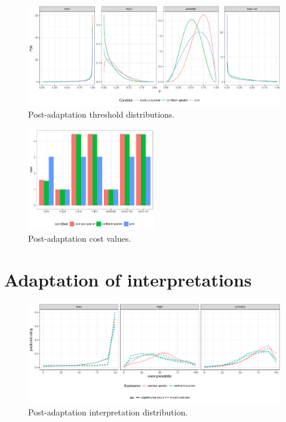 \documentclass[lucida,biblatex]{sp} %
\begin{document}
\begin{figure}
  \includegraphics[width=\textwidth]{plots/adaptation-posterior-thresholds.pdf}
  \caption{Post-adaptation threshold distributions. \label{fig:post-exposure-thresholds}}
\end{figure}

\begin{figure}
\center
  \includegraphics[width=0.5\textwidth]{plots/adaptation-posterior-costs.pdf}
  \caption{Post-adaptation cost values. \label{fig:post-exposure-costs}}
\end{figure}




\section{Adaptation of interpretations}
\label{sec:exp-model-interpretation}

\begin{figure}
  \includegraphics[width=\textwidth]{plots/adaptation-posterior-comp.pdf}
  \caption{Post-adaptation interpretation distribution. \label{fig:post-exposure-comp}}
\end{figure}
\end{document}
